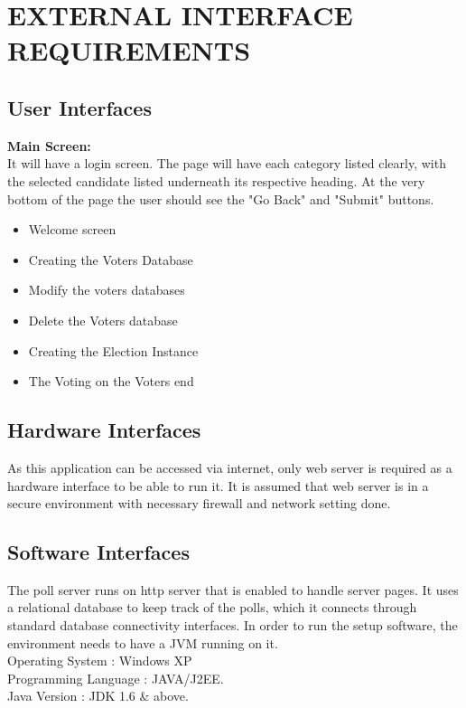 \documentclass[12pt,a4paper,oneside]{report}
\begin{document}
 \chapter{EXTERNAL INTERFACE REQUIREMENTS}
 \section{User Interfaces}
 \textbf{Main Screen:}\\
 It will have a login screen. The page will have each category listed clearly, with the selected candidate listed underneath its respective heading. At the very bottom of the page the user should see the "Go Back" and "Submit" buttons. 
 \begin{itemize}
 \item  Welcome screen 
 \item  Creating the Voters Database

\item  Modify the voters databases

\item  Delete the Voters database
\item  Creating the Election Instance
\item  The Voting on the Voters end



 \end{itemize}
 \section{Hardware Interfaces}

 As this application can be accessed via internet, only web server is required as a hardware interface to be able to run it. It is assumed that web server is in a secure environment with necessary firewall and network setting done. 

\section{Software Interfaces}
The poll server runs on http server that is enabled to handle server pages. It uses a relational database to keep track of the polls, which it connects through standard database connectivity interfaces. In order to run the setup software, the environment needs to have a JVM running on it.\\
Operating System	\hspace{.5 in}		: Windows XP\\
Programming Language	\hspace{.1 in}	: JAVA/J2EE.\\
Java Version			\hspace{.9 in}: JDK 1.6 \& above.\\
\end{document}

